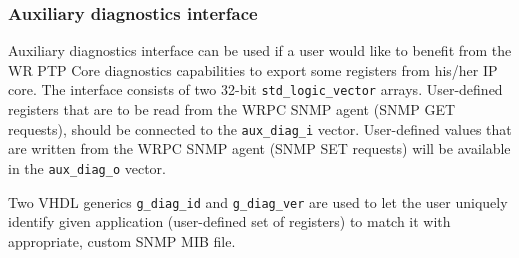 \subsubsection{Auxiliary diagnostics interface}
\label{sec:aux_diag}

Auxiliary diagnostics interface can be used if a user would like to benefit from
the WR PTP Core diagnostics capabilities to export some registers from his/her
IP core. The interface consists of two 32-bit \texttt{std\_logic\_vector}
arrays. User-defined registers that are to be read from the WRPC SNMP agent (SNMP
GET requests), should be connected to the \texttt{aux\_diag\_i} vector.
User-defined values that are written from the WRPC SNMP agent (SNMP SET
requests) will be available in the \texttt{aux\_diag\_o} vector.

Two VHDL generics \texttt{g\_diag\_id} and \texttt{g\_diag\_ver} are used to let
the user uniquely identify given application (user-defined set of registers)
to match it with appropriate, custom SNMP MIB file.
